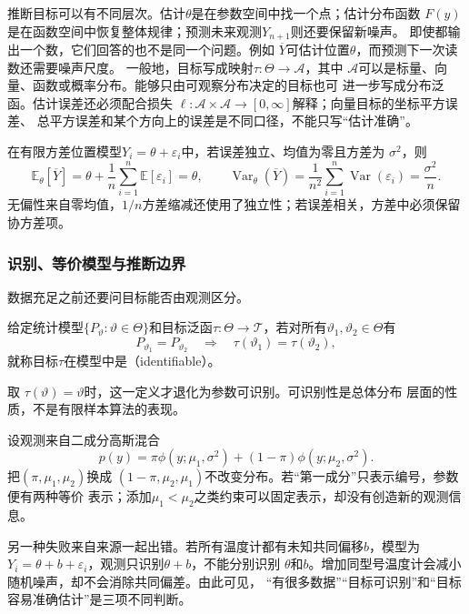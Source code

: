 推断目标可以有不同层次。估计\(\theta\)是在参数空间中找一个点；估计分布函数
\(F(y)\)是在函数空间中恢复整体规律；预测未来观测\(Y_{n+1}\)则还要保留新噪声。
即使都输出一个数，它们回答的也不是同一个问题。例如
\(\overline{Y}\)可估计位置\(\theta\)，而预测下一次读数还需要噪声尺度。
一般地，目标写成映射\(\tau:\Theta\to\mathcal A\)，其中
\(\mathcal A\)可以是标量、向量、函数或概率分布。能够只由可观察分布决定的目标也可
进一步写成分布泛函。估计误差还必须配合损失
\(\ell:\mathcal A\times\mathcal A\to[0,\infty]\)解释；向量目标的坐标平方误差、
总平方误差和某个方向上的误差是不同口径，不能只写“估计准确”。

在有限方差位置模型\(Y_i=\theta+\varepsilon_i\)中，若误差独立、均值为零且方差为
\(\sigma^2\)，则
\[
  \mathbb{E}_\theta[\overline Y]
  =\theta+\frac1n\sum_{i=1}^n\mathbb{E}[\varepsilon_i]
  =\theta,\qquad
  \operatorname{Var}_\theta(\overline Y)
  =\frac1{n^2}\sum_{i=1}^n\operatorname{Var}(\varepsilon_i)
  =\frac{\sigma^2}{n}.
\]
无偏性来自零均值，\(1/n\)方差缩减还使用了独立性；若误差相关，方差中必须保留
协方差项。

\subsubsection{识别、等价模型与推断边界}

数据充足之前还要问目标能否由观测区分。
\begin{definition}[目标可识别性]
  \label{def:statistics-identifiability}
  给定统计模型\(\{P_\vartheta:\vartheta\in\Theta\}\)和目标泛函\(\tau:\Theta\to\mathcal T\)，若对所有\(\vartheta_1,\vartheta_2\in\Theta\)有
\[
  P_{\vartheta_1}=P_{\vartheta_2}
  \quad\Longrightarrow\quad
  \tau(\vartheta_1)=\tau(\vartheta_2),
\]
就称目标\(\tau\)在模型中是（identifiable）。
\end{definition}
取
\(\tau(\vartheta)=\vartheta\)时，这一定义才退化为参数可识别。可识别性是总体分布
层面的性质，不是有限样本算法的表现。

\begin{example}[混合成分的标签交换]
\label{ex:statistics-mixture-label-switching}
设观测来自二成分高斯混合
\[
  p(y)=\pi\phi(y;\mu_1,\sigma^2)
       +(1-\pi)\phi(y;\mu_2,\sigma^2).
\]
把\((\pi,\mu_1,\mu_2)\)换成
\((1-\pi,\mu_2,\mu_1)\)不改变分布。若“第一成分”只表示编号，参数便有两种等价
表示；添加\(\mu_1<\mu_2\)之类约束可以固定表示，却没有创造新的观测信息。
\end{example}

另一种失败来自来源一起出错。若所有温度计都有未知共同偏移\(b\)，模型为
\(Y_i=\theta+b+\varepsilon_i\)，观测只识别\(\theta+b\)，不能分别识别
\(\theta\)和\(b\)。增加同型号温度计会减小随机噪声，却不会消除共同偏差。由此可见，
“有很多数据”“目标可识别”和“目标容易准确估计”是三项不同判断。

